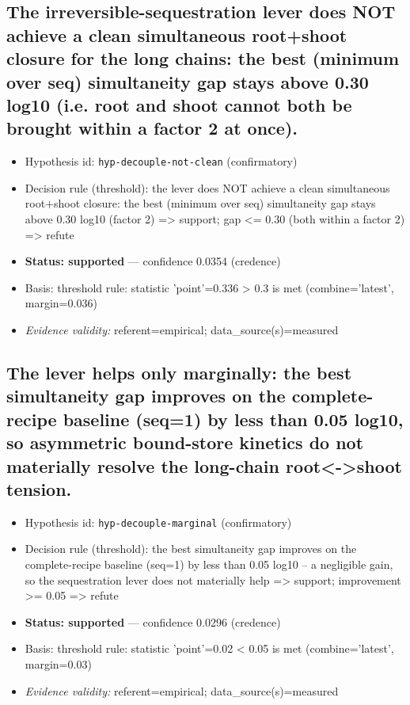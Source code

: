 \documentclass{article}
\begin{document}
\subsection{The irreversible-sequestration lever does NOT achieve a clean simultaneous root+shoot closure for the long chains: the best (minimum over seq) simultaneity gap stays above 0.30 log10 (i.e. root and shoot cannot both be brought within a factor 2 at once).}
\begin{itemize}
  \item Hypothesis id: \texttt{hyp-decouple-not-clean} (confirmatory)
  \item Decision rule (threshold): the lever does NOT achieve a clean simultaneous root+shoot closure: the best (minimum over seq) simultaneity gap stays above 0.30 log10 (factor 2) => support; gap <= 0.30 (both within a factor 2) => refute
  \item \textbf{Status: supported} --- confidence 0.0354 (credence)
  \item Basis: threshold rule: statistic 'point'=0.336 > 0.3 is met (combine='latest', margin=0.036)
  \item \textit{Evidence validity:} referent=empirical; data\_source(s)=measured
\end{itemize}

\subsection{The lever helps only marginally: the best simultaneity gap improves on the complete-recipe baseline (seq=1) by less than 0.05 log10, so asymmetric bound-store kinetics do not materially resolve the long-chain root<->shoot tension.}
\begin{itemize}
  \item Hypothesis id: \texttt{hyp-decouple-marginal} (confirmatory)
  \item Decision rule (threshold): the best simultaneity gap improves on the complete-recipe baseline (seq=1) by less than 0.05 log10 -- a negligible gain, so the sequestration lever does not materially help => support; improvement >= 0.05 => refute
  \item \textbf{Status: supported} --- confidence 0.0296 (credence)
  \item Basis: threshold rule: statistic 'point'=0.02 < 0.05 is met (combine='latest', margin=0.03)
  \item \textit{Evidence validity:} referent=empirical; data\_source(s)=measured
\end{itemize}
\end{document}
